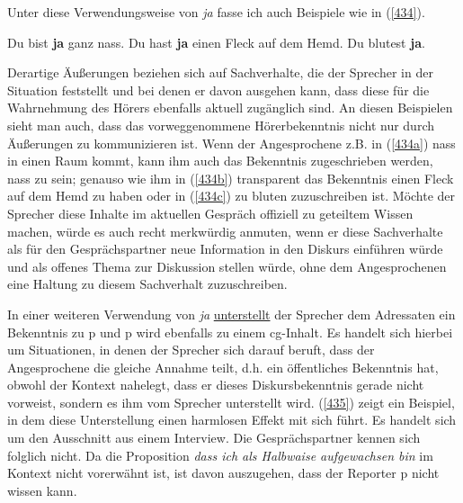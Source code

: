 Unter diese Verwendungsweise von \textit{ja} fasse ich auch Beispiele wie in (\ref{434}).

\begin{exe}
	\ex\label{434} 
	\begin{xlist}
		\ex\label{434a} Du bist \textbf{ja} ganz nass.	
 		\ex\label{434b}	Du hast \textbf{ja} einen Fleck auf dem Hemd.
 		\ex\label{434c}	Du blutest \textbf{ja}.				
 	\end{xlist}	
\end{exe}	
Derartige Äußerungen beziehen sich auf Sachverhalte, die der Sprecher in der Situation feststellt und bei denen er davon ausgehen kann, dass diese für die Wahrnehmung des Hörers ebenfalls aktuell zugänglich sind. An diesen Beispielen sieht man auch, dass das vorweggenommene Hörerbekenntnis nicht nur durch Äußerungen zu kommunizieren ist. Wenn der Angesprochene z.B. in (\ref{434a}) nass in einen Raum kommt, kann ihm auch das Bekenntnis zugeschrieben werden, nass zu sein; genauso wie ihm in (\ref{434b}) transparent das Bekenntnis einen Fleck auf dem Hemd zu haben oder in (\ref{434c}) zu bluten zuzuschreiben ist. Möchte der Sprecher diese Inhalte im aktuellen Gespräch offiziell zu geteiltem Wissen machen, würde es auch recht merkwürdig anmuten, wenn er diese Sachverhalte als für den Gesprächspartner neue Information in den Diskurs einführen würde und als offenes Thema zur Diskussion stellen würde, ohne dem Angesprochenen eine Haltung zu diesem Sachverhalt zuzuschreiben.
		
In einer weiteren Verwendung von \textit{ja} \underline{unterstellt} der Sprecher dem Adressaten ein Bekenntnis zu p und p wird ebenfalls zu einem cg-Inhalt. Es handelt sich hierbei um Situationen, in denen der Sprecher sich darauf beruft, dass der Angesprochene die gleiche Annahme teilt, d.h. ein öffentliches Bekenntnis hat, obwohl der Kontext nahelegt, dass er dieses Diskursbekenntnis gerade nicht vorweist, sondern es ihm vom Sprecher unterstellt wird. (\ref{435}) zeigt ein Beispiel, in dem diese Unterstellung einen harmlosen Effekt mit sich führt. Es handelt sich um den Ausschnitt aus einem Interview. Die Gesprächspartner kennen sich \\ folglich nicht. Da die Proposition \textit{dass ich als Halbwaise aufgewachsen bin} im Kontext nicht vorerwähnt ist, ist davon auszugehen, dass der Reporter p nicht wissen kann.

